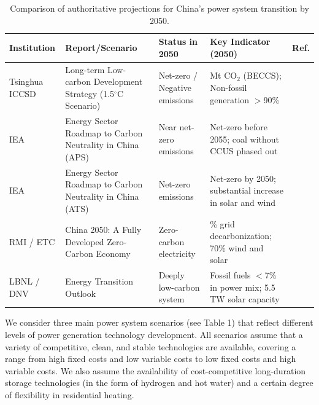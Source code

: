 \documentclass[preprint,12pt]{elsarticle}
\begin{document}
\begin{table}[htbp]
  \centering
  \caption{Comparison of authoritative projections for China's power system transition by 2050.}
  \label{tab:comparison_2050}
  \footnotesize
  \begin{tabularx}{\linewidth}{>{\raggedright\arraybackslash}p{2.2cm} >{\raggedright\arraybackslash}X >{\raggedright\arraybackslash}p{2.5cm} >{\raggedright\arraybackslash}X l}
  \hline
  \bfseries Institution & \bfseries Report/Scenario & \bfseries Status in 2050 & \bfseries Key Indicator (2050) & \bfseries Ref. \\ \hline
  Tsinghua ICCSD & Long-term Low-carbon Development Strategy (1.5$^\circ$C Scenario) & Net-zero / Negative emissions & -150 Mt CO$_2$ (BECCS); Non-fossil generation $>$90\% & \citep{tsinghua_iccsd_2020} \\
  IEA & Energy Sector Roadmap to Carbon Neutrality in China (APS) & Near net-zero emissions & Net-zero before 2055; coal without CCUS phased out & \citep{iea_roadmap_2021} \\
  IEA & Energy Sector Roadmap to Carbon Neutrality in China (ATS) & Net-zero emissions & Net-zero by 2050; substantial increase in solar and wind & \citep{iea_roadmap_2021} \\
  RMI / ETC & China 2050: A Fully Developed Zero-Carbon Economy & Zero-carbon electricity & 100\% grid decarbonization; 70\% wind and solar & \citep{rmi_china_2050} \\
  LBNL / DNV & Energy Transition Outlook & Deeply low-carbon system & Fossil fuels $<$7\% in power mix; 5.5 TW solar capacity & \citep{liu_chinas_2025} \\ \hline
  \end{tabularx}
\end{table}

We consider three main power system scenarios (see Table 1) that reflect different levels of power generation technology development. All scenarios assume that a variety of competitive, clean, and stable technologies are available, covering a range from high fixed costs and low variable costs to low fixed costs and high variable costs. We also assume the availability of cost-competitive long-duration storage technologies (in the form of hydrogen and hot water) and a certain degree of flexibility in residential heating.
\end{document}

